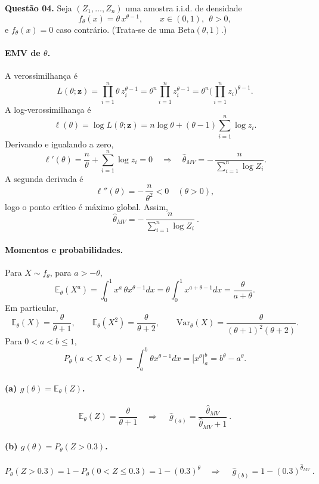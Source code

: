 \textbf{Questão 04.} Seja $(Z_1,\ldots,Z_n)$ uma amostra i.i.d. de densidade
\[
f_\theta(x)=\theta\,x^{\theta-1},\qquad x\in(0,1),\ \ \theta>0,
\]
e $f_\theta(x)=0$ caso contrário. (Trata-se de uma Beta$(\theta,1)$.)

\paragraph{EMV de $\theta$.}
A verossimilhança é
\[
L(\theta;\mathbf z)=\prod_{i=1}^n \theta\,z_i^{\theta-1}
=\theta^n\prod_{i=1}^n z_i^{\theta-1}
=\theta^n\Big(\prod_{i=1}^n z_i\Big)^{\theta-1}.
\]
A log-verossimilhança é
\[
\ell(\theta)=\log L(\theta;\mathbf z)
=n\log\theta+(\theta-1)\sum_{i=1}^n\log z_i .
\]
Derivando e igualando a zero,
\[
\ell'(\theta)=\frac{n}{\theta}+\sum_{i=1}^n\log z_i=0
\quad\Longrightarrow\quad
\widehat\theta_{MV}=-\,\frac{n}{\sum_{i=1}^n\log Z_i}.
\]
A segunda derivada é
\[
\ell''(\theta)=-\,\frac{n}{\theta^2}<0\quad(\theta>0),
\]
logo o ponto crítico é máximo global. Assim,
\[
\boxed{\ \widehat\theta_{MV}=-\,\dfrac{n}{\sum_{i=1}^n\log Z_i}\ }.
\]

\paragraph{Momentos e probabilidades.}
Para $X\sim f_\theta$, para $a>- \theta$,
\[
\mathbb E_\theta(X^a)=\int_0^1 x^a\,\theta x^{\theta-1}dx
=\theta\int_0^1 x^{a+\theta-1}dx
=\frac{\theta}{a+\theta}.
\]
Em particular,
\[
\mathbb E_\theta(X)=\frac{\theta}{\theta+1},\qquad
\mathbb E_\theta(X^2)=\frac{\theta}{\theta+2},\qquad
\mathrm{Var}_\theta(X)=\frac{\theta}{(\theta+1)^2(\theta+2)}.
\]
Para $0<a<b\le1$,
\[
P_\theta(a<X<b)=\int_a^b \theta x^{\theta-1}dx
=\Big[x^\theta\Big]_a^b=b^\theta-a^\theta.
\]

\paragraph{(a) $g(\theta)=\mathbb E_\theta(Z)$.}
\[
\mathbb E_\theta(Z)=\frac{\theta}{\theta+1}
\quad\Longrightarrow\quad
\boxed{\ \widehat g_{(a)}=\frac{\widehat\theta_{MV}}{\widehat\theta_{MV}+1}\ }.
\]

\paragraph{(b) $g(\theta)=P_\theta(Z>0.3)$.}
\[
P_\theta(Z>0.3)=1-P_\theta(0<Z\le0.3)=1-(0.3)^\theta
\quad\Longrightarrow\quad
\boxed{\ \widehat g_{(b)}=1-(0.3)^{\widehat\theta_{MV}}\ }.
\]

